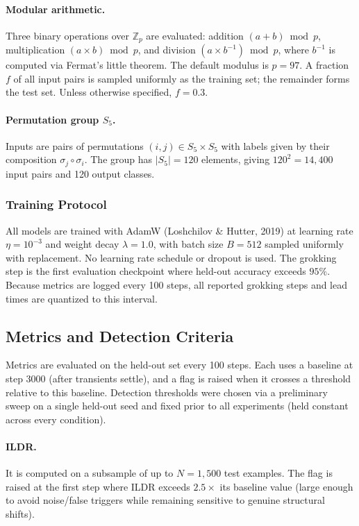 \documentclass{article}
\begin{document}
\paragraph{Modular arithmetic.}
Three binary operations over $\mathbb{Z}_p$ are evaluated:
addition $(a + b) \bmod p$, multiplication $(a \times b) \bmod p$,
and division $(a \times b^{-1}) \bmod p$, where $b^{-1}$ is computed
via Fermat's little theorem. The default modulus is $p = 97$.
A fraction $f$ of all input pairs is sampled uniformly as the
training set; the remainder forms the test set.
Unless otherwise specified, $f = 0.3$.

\paragraph{Permutation group $S_5$.}
Inputs are pairs of permutations $(i, j) \in S_5 \times S_5$
with labels given by their composition $\sigma_j \circ \sigma_i$.
The group has $|S_5| = 120$ elements, giving $120^2 = 14{,}400$
input pairs and 120 output classes.

\subsubsection{Training Protocol}

All models are trained with AdamW (Loshchilov \& Hutter, 2019)
at learning rate $\eta = 10^{-3}$ and weight decay $\lambda = 1.0$,
with batch size $B = 512$ sampled uniformly with replacement.
No learning rate schedule or dropout is used. The grokking step is the first evaluation checkpoint where held-out accuracy exceeds $95\%$. Because metrics are logged every 100 steps, all reported grokking steps and lead times are quantized to this interval.


\subsection{Metrics and Detection Criteria}

Metrics are evaluated on the held-out set every 100 steps. Each uses a baseline at step 3000 (after transients settle), and a flag is raised when it crosses a threshold relative to this baseline.
Detection thresholds were chosen via a preliminary sweep on a single held-out seed and fixed prior to all experiments (held constant across every condition). 

\paragraph{ILDR.}
It is computed on a subsample of up to $N = 1{,}500$ test examples.
The flag is raised at the first step where ILDR exceeds
$2.5\times$ its baseline value (large enough to avoid noise/false triggers while remaining sensitive to genuine structural shifts).
\end{document}
